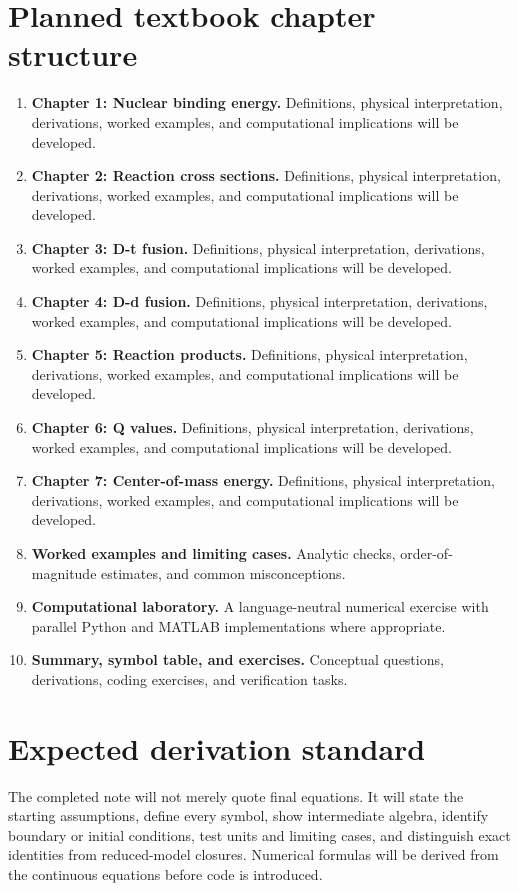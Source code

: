 \documentclass[11pt]{article}
\begin{document}
\section{Planned textbook chapter structure}
\begin{enumerate}[leftmargin=1.8em]
\item \textbf{Chapter 1: Nuclear binding energy.} Definitions, physical interpretation, derivations, worked examples, and computational implications will be developed.
\item \textbf{Chapter 2: Reaction cross sections.} Definitions, physical interpretation, derivations, worked examples, and computational implications will be developed.
\item \textbf{Chapter 3: D-t fusion.} Definitions, physical interpretation, derivations, worked examples, and computational implications will be developed.
\item \textbf{Chapter 4: D-d fusion.} Definitions, physical interpretation, derivations, worked examples, and computational implications will be developed.
\item \textbf{Chapter 5: Reaction products.} Definitions, physical interpretation, derivations, worked examples, and computational implications will be developed.
\item \textbf{Chapter 6: Q values.} Definitions, physical interpretation, derivations, worked examples, and computational implications will be developed.
\item \textbf{Chapter 7: Center-of-mass energy.} Definitions, physical interpretation, derivations, worked examples, and computational implications will be developed.
\item \textbf{Worked examples and limiting cases.} Analytic checks, order-of-magnitude estimates, and common misconceptions.
\item \textbf{Computational laboratory.} A language-neutral numerical exercise with parallel Python and MATLAB implementations where appropriate.
\item \textbf{Summary, symbol table, and exercises.} Conceptual questions, derivations, coding exercises, and verification tasks.
\end{enumerate}

\section{Expected derivation standard}
The completed note will not merely quote final equations. It will state the starting assumptions, define every symbol, show intermediate algebra, identify boundary or initial conditions, test units and limiting cases, and distinguish exact identities from reduced-model closures. Numerical formulas will be derived from the continuous equations before code is introduced.
\end{document}
